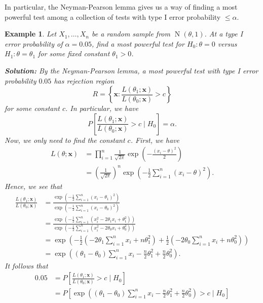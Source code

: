 \documentclass[10pt]{article}
\DeclareMathOperator{\Nor}{N}
\theoremstyle{newstyle}
\newtheorem{exmp}[thm]{Example}
\begin{document}
In particular, the Neyman-Pearson lemma gives us a way of finding a most powerful test among 
a collection of tests with type I error probability $\leq \alpha$. 

\begin{exmp}
Let $X_1, \dots, X_n$ be a random sample from $\Nor(\theta, 1)$. At a type I error probability 
of $\alpha = 0.05$, find a most powerful test for $H_0 : \theta = 0$ versus $H_1 : \theta = \theta_1$ for 
some fixed constant $\theta_1 > 0$. 

{\color{blue}
{\bf Solution:} By the Neyman-Pearson lemma, a most powerful test with type I error probability $0.05$ has 
rejection region 
\[ R = \left\{ \mathbf x : \frac{L(\theta_1; \mathbf x)}{L(\theta_0; \mathbf x)} > c \right\} \]
for some constant $c$. In particular, we have 
\[ P \left[ \frac{L(\theta_1; \mathbf x)}{L(\theta_0; \mathbf x)} > c \;\Bigg|\; H_0 \right] = \alpha. \]
Now, we only need to find the constant $c$. First, we have 
\begin{align*}
    L(\theta; \mathbf x) 
    &= \prod_{i=1}^n \frac{1}{\sqrt{2\pi}} \exp \left( - \frac{(x_i-\theta)^2}2 \right) \\
    &= \left( \frac{1}{\sqrt{2\pi}} \right)^n \exp \left( -\frac12 \sum_{i=1}^n (x_i - \theta)^2 
    \right). 
\end{align*}
Hence, we see that 
\begin{align*}
    \frac{L(\theta_1; \mathbf x)}{L(\theta_0; \mathbf x)} 
    &= \frac{\exp(-\frac12 \sum_{i=1}^n (x_i - \theta_1)^2)}{\exp(-\frac12 \sum_{i=1}^n (x_i - \theta_0)^2)} \\
    &= \frac{\exp(-\frac12 \sum_{i=1}^n (x_i^2 - 2\theta_1 x_i + \theta_1^2))}{\exp(-\frac12\sum_{i=1}^n(x_i^2 - 2\theta_0 x_i + \theta_0^2))} \\
    &= \exp \left( -\frac12 \left(-2\theta_1 \sum_{i=1}^n x_i + n\theta_1^2 \right) 
    + \frac12 \left(-2\theta_0 \sum_{i=1}^n x_i + n\theta_0^2 \right) \right) \\
    &= \exp \left( (\theta_1 - \theta_0) \sum_{i=1}^n x_i - \frac{n}2 \theta_1^2 + \frac{n}2 \theta_0^2 
    \right). 
\end{align*}
It follows that 
\begin{align*}
    0.05 &= P \left[ \frac{L(\theta_1; \mathbf x)}{L(\theta_0; \mathbf x)} > c \;\Bigg|\; H_0 \right] \\
    &= P \left[ \exp \left( (\theta_1 - \theta_0) \sum_{i=1}^n x_i - \frac{n}2 \theta_1^2 + \frac{n}2 \theta_0^2 \right) > c \;\Bigg|\; H_0 \right] \\

\end{align*}}
\end{exmp}
\end{document}
